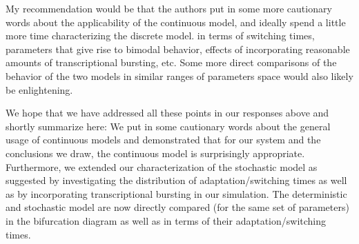 \documentclass[11pt,letterpaper]{article}
\begin{document}
%

\begin{review}
My recommendation would be that the authors put in some more cautionary words about the applicability of the continuous model, and ideally spend a little more time characterizing the discrete model. in terms of switching times, parameters that give rise to bimodal behavior, effects of incorporating reasonable amounts of transcriptional bursting, etc. Some more direct comparisons of the behavior of the two models in similar ranges of parameters space would also likely be enlightening.
\end{review}

\begin{response}
We hope that we have addressed all these points in our responses above
and shortly summarize here: We put in some cautionary words about the
general usage of continuous models and demonstrated that for our system
and the conclusions we draw, the continuous model is surprisingly appropriate.
Furthermore, we extended our characterization of the stochastic model as
suggested by investigating the distribution of adaptation/switching
times as well as by incorporating transcriptional bursting in our
simulation. The deterministic and stochastic model are now directly
compared (for the same set of parameters) in the bifurcation diagram as
well as in terms of their adaptation/switching times.
\end{response}
\end{document}
